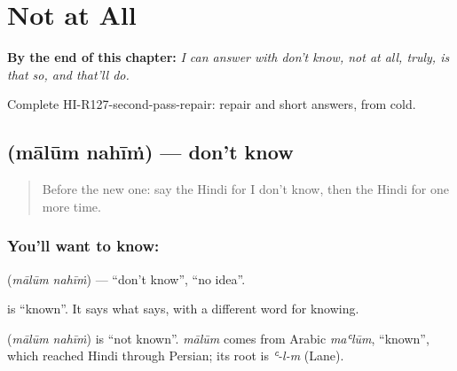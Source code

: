 
\chapter{Not at All}
\label{ch:hi-not-at-all}

\begin{chapteropening}
\textbf{By the end of this chapter:} \emph{I can answer with don't know, not at all, truly, is that so, and that'll do.}

Complete HI-R127-second-pass-repair: repair and short answers, from cold.
\end{chapteropening}

\section[\texorpdfstring{\hi{मालूम} \hi{नहीं} (mālūm nahīṁ)}{मालूम नहीं (mālūm nahīṁ)}]{  (mālūm nahīṁ) — don't know}

\label{lesson:HI-C127-malumnahin}



\begin{quote}
Before the new one: say the Hindi for I don't know, then the Hindi for one more time.
\end{quote}

\subsection*{You'll want to know:  }
\textbf{ } (\emph{mālūm nahīṁ}) — \textquotedblleft{}don't know\textquotedblright{}, \textquotedblleft{}no idea\textquotedblright{}.

\textbf{} is \textquotedblleft{}known\textquotedblright{}. It says what \textbf{  } says, with a different word for knowing.

\begin{cousinweb}
\textbf{ } (\emph{mālūm nahīṁ}) is \textquotedblleft{}not known\textquotedblright{}. \emph{mālūm} comes from Arabic \emph{maʿlūm}, \textquotedblleft{}known\textquotedblright{}, which reached Hindi through Persian; its root is \emph{ʿ-l-m} (Lane).
\end{cousinweb}

